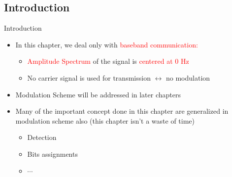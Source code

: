 \documentclass{Beamer}
\begin{document}
\subsection{Introduction}
\begin{frame}[t]{Introduction}

\begin{itemize}

\item In this chapter, we deal only with \textcolor{red}{baseband communication:}

	\begin{itemize}
	\item \textcolor{red}{Amplitude Spectrum} of the signal is \textcolor{red}{centered at 0 Hz}
	
	\item No carrier signal is used for transmission $\leftrightarrow$ no modulation
	
	\end{itemize}

\item Modulation Scheme will be addressed in later chapters

\item Many of the important concept done in this chapter are generalized in modulation scheme also (this chapter isn't a waste of time)

	\begin{itemize}
	\item Detection
	
	\item Bits assignments
	
	\item $\cdots$
	\end{itemize}

\end{itemize}


\end{frame}
\end{document}
